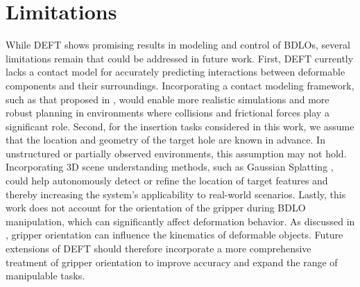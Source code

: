 \section{Limitations}
While DEFT shows promising results in modeling and control of BDLOs, several limitations remain that could be addressed in future work. 
First, DEFT currently lacks a contact model for accurately predicting interactions between deformable components and their surroundings. Incorporating a contact modeling framework, such as that proposed in \cite{DER_contact}, would enable more realistic simulations and more robust planning in environments where collisions and frictional forces play a significant role.
Second, for the insertion tasks considered in this work, we assume that the location and geometry of the target hole are known in advance. 
In unstructured or partially observed environments, this assumption may not hold. 
Incorporating 3D scene understanding methods, such as Gaussian Splatting \cite{splanning}, could help autonomously detect or refine the location of target features and thereby increasing the system’s applicability to real-world scenarios.
Lastly, this work does not account for the orientation of the gripper during BDLO manipulation, which can significantly affect deformation behavior. As discussed in \cite{diminishingridgidity}, gripper orientation can influence the kinematics of deformable objects. 
Future extensions of DEFT should therefore incorporate a more comprehensive treatment of gripper orientation to improve accuracy and expand the range of manipulable tasks.